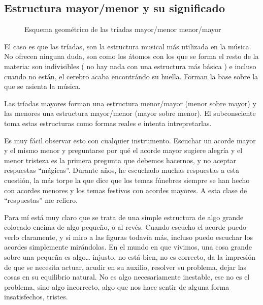 \documentclass[]{article}
\begin{document}
\subsection{Estructura mayor/menor y su significado}

\begin{figure}
  \center
 
   \vspace{12pt}
 
 \caption{Esquema geométrico de las tríadas mayor/menor menor/mayor}
 \label{fig:maj-minor-scheme}
 \end{figure}

 
El caso es que las tríadas, son la estructura musical más utilizada en la música. No ofrecen ninguna duda, son como los átomos con los que se forma el resto de la materia: son indivisibles ( no hay nada con una estructura más básica ) e incluso cuando no están, el cerebro acaba encontrándo su huella. Forman la base sobre la que se asienta la música.

Las tríadas mayores forman una estructura menor/mayor (menor sobre mayor) y las menores una estructura mayor/menor (mayor sobre menor). El subconsciente toma estas estructuras como formas reales e intenta intrepretarlas.

Es muy fácil observar esto con cualquier instrumento. Escuchar un acorde mayor y el mismo menor y preguntarse por qué el acorde mayor sugiere alegría y el menor tristeza es la primera pregunta que debemos hacernos, y no aceptar respuestas ``mágicas''. Durante años, he escuchado muchas respuestas a esta cuestión, la más torpe la que dice que los temas fúnebres siempre se han hecho con acordes menores y los temas festivos con acordes mayores. A esta clase de ``respuestas'' me refiero.

Para mí está muy claro que se trata de una simple estructura de algo grande colocado encima de algo pequeño, o al revés. Cuando escucho el acorde puedo verlo claramente, y si miro a las figuras todavía más, incluso puedo escuchar los acordes simplemente mirándolas. En el mundo en que vivimos, una cosa grande sobre una pequeña es algo\ldots{} injusto, no está bien, no es correcto, da la impresión de que se necesita actuar, acudir en su auxilio, resolver su problema, dejar las cosas en su equilibrio natural. No es algo necesariamente inestable, ese no es el problema, sino algo incorrecto, algo que nos hace sentir de alguna forma insatisfechos, tristes.
\end{document}
